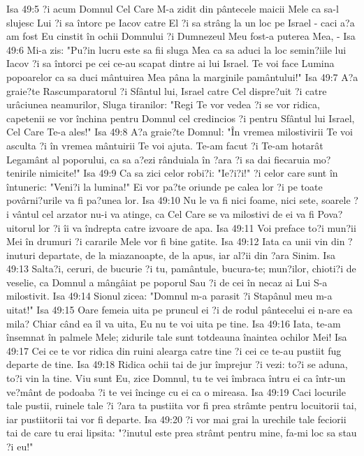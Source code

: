 Isa 49:5  ?i acum Domnul Cel Care M-a zidit din pântecele maicii Mele ca sa-l slujesc Lui ?i sa întorc pe Iacov catre El ?i sa strâng la un loc pe Israel - caci a?a am fost Eu cinstit în ochii Domnului ?i Dumnezeul Meu fost-a puterea Mea, -
Isa 49:6  Mi-a zis: "Pu?in lucru este sa fii sluga Mea ca sa aduci la loc semin?iile lui Iacov ?i sa întorci pe cei ce-au scapat dintre ai lui Israel. Te voi face Lumina popoarelor ca sa duci mântuirea Mea pâna la marginile pamântului!"
Isa 49:7  A?a graie?te Rascumparatorul ?i Sfântul lui, Israel catre Cel dispre?uit ?i catre urâciunea neamurilor, Sluga tiranilor: "Regi Te vor vedea ?i se vor ridica, capetenii se vor închina pentru Domnul cel credincios ?i pentru Sfântul lui Israel, Cel Care Te-a ales!"
Isa 49:8  A?a graie?te Domnul: "În vremea milostivirii Te voi asculta ?i în vremea mântuirii Te voi ajuta. Te-am facut ?i Te-am hotarât Legamânt al poporului, ca sa a?ezi rânduiala în ?ara ?i sa dai fiecaruia mo?tenirile nimicite!"
Isa 49:9  Ca sa zici celor robi?i: "Ie?i?i!" ?i celor care sunt în întuneric: "Veni?i la lumina!" Ei vor pa?te oriunde pe calea lor ?i pe toate povârni?urile va fi pa?unea lor.
Isa 49:10  Nu le va fi nici foame, nici sete, soarele ?i vântul cel arzator nu-i va atinge, ca Cel Care se va milostivi de ei va fi Pova?uitorul lor ?i îi va îndrepta catre izvoare de apa.
Isa 49:11  Voi preface to?i mun?ii Mei în drumuri ?i cararile Mele vor fi bine gatite.
Isa 49:12  Iata ca unii vin din ?inuturi departate, de la miazanoapte, de la apus, iar al?ii din ?ara Sinim.
Isa 49:13  Salta?i, ceruri, de bucurie ?i tu, pamântule, bucura-te; mun?ilor, chioti?i de veselie, ca Domnul a mângâiat pe poporul Sau ?i de cei în necaz ai Lui S-a milostivit.
Isa 49:14  Sionul zicea: "Domnul m-a parasit ?i Stapânul meu m-a uitat!"
Isa 49:15  Oare femeia uita pe pruncul ei ?i de rodul pântecelui ei n-are ea mila? Chiar când ea îl va uita, Eu nu te voi uita pe tine.
Isa 49:16  Iata, te-am însemnat în palmele Mele; zidurile tale sunt totdeauna înaintea ochilor Mei!
Isa 49:17  Cei ce te vor ridica din ruini alearga catre tine ?i cei ce te-au pustiit fug departe de tine.
Isa 49:18  Ridica ochii tai de jur împrejur ?i vezi: to?i se aduna, to?i vin la tine. Viu sunt Eu, zice Domnul, tu te vei îmbraca întru ei ca într-un ve?mânt de podoaba ?i te vei încinge cu ei ca o mireasa.
Isa 49:19  Caci locurile tale pustii, ruinele tale ?i ?ara ta pustiita vor fi prea strâmte pentru locuitorii tai, iar pustiitorii tai vor fi departe.
Isa 49:20  ?i vor mai grai la urechile tale feciorii tai de care tu erai lipsita: "?inutul este prea strâmt pentru mine, fa-mi loc sa stau ?i eu!"
